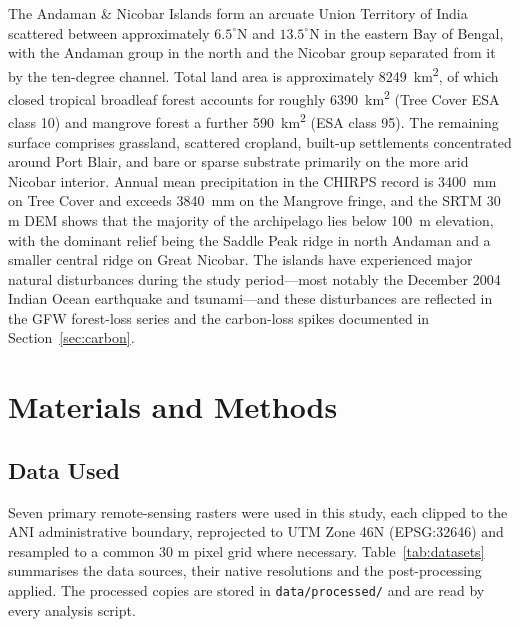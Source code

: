 \documentclass[12pt,a4paper]{article}
\begin{document}
The Andaman \& Nicobar Islands form an arcuate Union Territory of
India scattered between approximately $6.5^\circ$N and $13.5^\circ$N
in the eastern Bay of Bengal, with the Andaman group in the north
and the Nicobar group separated from it by the ten-degree channel.
Total land area is approximately \SI{8249}{\square\kilo\metre},
of which closed tropical broadleaf forest accounts for roughly
\SI{6390}{\square\kilo\metre} (Tree Cover ESA class 10) and mangrove
forest a further \SI{590}{\square\kilo\metre} (ESA class 95). The
remaining surface comprises grassland, scattered cropland, built-up
settlements concentrated around Port Blair, and bare or sparse
substrate primarily on the more arid Nicobar interior. Annual mean
precipitation in the CHIRPS record is \SI{3400}{\milli\metre} on Tree
Cover and exceeds \SI{3840}{\milli\metre} on the Mangrove fringe, and
the SRTM 30 m DEM shows that the majority of the archipelago lies
below \SI{100}{\metre} elevation, with the dominant relief being the
Saddle Peak ridge in north Andaman and a smaller central ridge on
Great Nicobar. The islands have experienced major natural
disturbances during the study period---most notably the December 2004
Indian Ocean earthquake and tsunami---and these disturbances are
reflected in the GFW forest-loss series and the carbon-loss spikes
documented in Section~\ref{sec:carbon}.

\section{Materials and Methods}

\subsection{Data Used}
\label{sec:data}

Seven primary remote-sensing rasters were used in this study, each
clipped to the ANI administrative boundary, reprojected to UTM Zone
46N (EPSG:32646) and resampled to a common 30 m pixel grid where
necessary. Table~\ref{tab:datasets} summarises the data sources,
their native resolutions and the post-processing applied. The
processed copies are stored in \texttt{data/processed/} and are
read by every analysis script.
\end{document}
